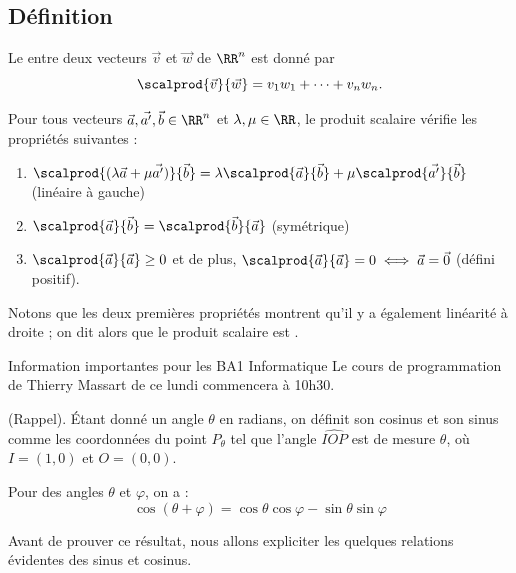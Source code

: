 \subsection{Définition}
\begin{frame}
\begin{definition}
  Le  entre deux vecteurs \(\vec v\) et \(\vec w\) de \(\RR^{n}\) est donné par
  \begin{equation*}
    \scalprod {\vec v} {\vec w} = v_{1} w_{1} + \cdots + v_{n} w_{n}.
  \end{equation*}
\end{definition}

\begin{proposition}Pour tous vecteurs \(\vec a,\vec {a'},\vec b \in \RR^{n}\) et \(\lambda, \mu \in \RR\), le produit scalaire vérifie les propriétés suivantes :
  \begin{enumerate}
  \item $\scalprod{(\lambda \vec{a} + \mu \vec{a'})}{\vec{b}} = \lambda \scalprod{\vec{a}}{\vec{b}} + \mu \scalprod{\vec{a'}}{\vec{b}}$ (linéaire à gauche)
  \item $\scalprod{\vec{a}}{\vec{b}}=\scalprod{\vec{b}}{\vec{a}}$ (symétrique)
  \item $\scalprod{\vec{a}}{\vec{a}} \geq 0$ et de plus, $\scalprod{\vec{a}}{\vec{a}} = 0 \iff \vec{a} = \vec 0$ (défini positif).
  \end{enumerate}
\end{proposition}
Notons que les deux premières propriétés montrent qu'il y a également linéarité à droite ; on dit alors que le produit scalaire est .
\end{frame}
\begin{frame}%
  \begin{block}{Information importantes pour les BA1 Informatique}
    Le cours de programmation de Thierry Massart de ce lundi commencera à 10h30.
  \end{block}
\end{frame}
\begin{frame}
  \begin{definition}(Rappel). 
    Étant donné un angle \(\theta\) en radians, on définit son cosinus et son sinus comme les coordonnées du point \(P_{\theta}\) tel que l'angle \(\widehat{IOP}\) est de mesure \(\theta\), où \(I = (1,0)\) et \(O = (0,0)\).
  \end{definition}\pause

  \begin{proposition}Pour des angles \(\theta\) et \(\varphi\), on a :
    \begin{equation*}
      \cos (\theta + \varphi) = \cos \theta \cos \varphi - \sin \theta \sin \varphi
    \end{equation*}
  \end{proposition}\pause

  Avant de prouver ce résultat, nous allons expliciter les quelques relations \og évidentes\fg{} des sinus et cosinus.
\end{frame}
